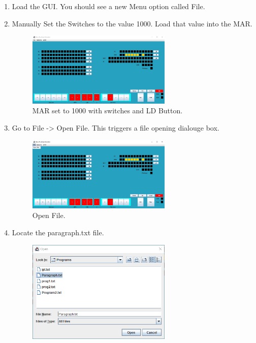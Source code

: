 \documentclass[10pt]{article}
\begin{document}
\begin{enumerate}
  \item Load the GUI. You should see a new Menu option called File.
  \item Manually Set the Switches to the value 1000. Load that value into the MAR.
  \begin{figure}[H]
    \centering
    \includegraphics[width=0.65\textwidth]{Pics/Fig17.png}
    \caption{MAR set to 1000 with switches and LD Button.}
    \label{fig:MAR Set}
  \end{figure}
  \item Go to File -> Open File. This triggers a file opening dialouge box.
  \begin{figure}[H]
    \centering
    \includegraphics[width=0.65\textwidth]{Pics/Fig18.png}
    \caption{Open File.}
    \label{fig:OpenFile}
  \end{figure}
  \item Locate the paragraph.txt file.
  \begin{figure}[H]
    \centering
    \includegraphics[width=0.65\textwidth]{Pics/Fig20.png}

\end{figure}
\end{enumerate}
\end{document}
